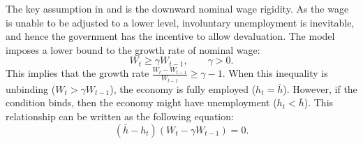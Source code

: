 The key assumption in \citet*{Schmitt-Uribe-16} and \citet{Na-18} is the downward nominal wage rigidity.
As the wage is unable to be adjusted to a lower level, involuntary unemployment is inevitable, and hence the government has the incentive to allow devaluation. The model imposes a lower bound to the growth rate of nominal wage:
\begin{equation}
    W_t \ge \gamma W_{t-1}, \qquad \gamma > 0.
\end{equation}
This implies that the growth rate $\frac{W_{t} - W_{t-1}}{W_{t-1}} \ge \gamma - 1$. When this inequality is unbinding ($W_t > \gamma W_{t-1}$), the economy is fully employed ($h_t = \bar{h}$). However, if the condition binds, then the economy might have unemployment ($h_t < \bar{h}$). This relationship can be written as the following equation:
\begin{equation}
    \label{eq:wage-rigid}
    (\bar{h} - h_t)(W_t - \gamma W_{t-1}) = 0.
\end{equation}
